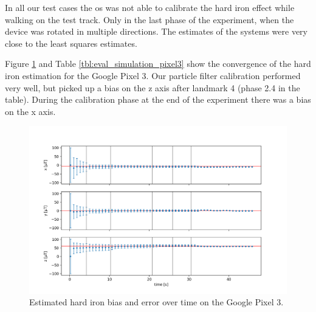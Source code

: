 In all our test cases the \gls{os} was not able to calibrate the hard iron effect while walking on the test track. Only in the last phase of the experiment, when the device was rotated in multiple directions. The estimates of the systems were very close to the least squares estimates.

Figure \ref{fig:eval_simulation_pixel3} and Table \ref{tbl:eval_simulation_pixel3} show the convergence of the hard iron estimation for the Google Pixel 3. Our particle filter calibration performed very well, but picked up a bias on the z axis after landmark 4 (phase 2.4 in the table). During the calibration phase at the end of the experiment there was a bias on the x axis.

\begin{figure}[H]
    \centering
    \includegraphics[width=1.0\textwidth]{figures/convergence_pixel3.png}
    \caption{Estimated hard iron bias and error over time on the Google Pixel 3.}
    \label{fig:eval_simulation_pixel3}
\end{figure}

